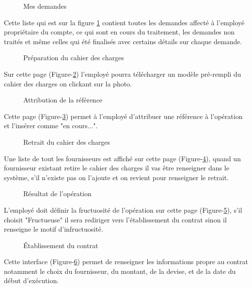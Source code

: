 \documentclass{report}
\begin{document}
\vspace{0.2cm}
\begin{figure}[h]
        \centering
        \caption{Mes demandes}
        \label{7}
\end{figure}
Cette liste qui est sur la figure \ref{7} contient toutes les demandes affecté à l'employé propriétaire du compte, ce qui sont en cours du traitement, les demandes non traités et même celles qui été finalisés avec certains détails sur chaque demande.

\newpage
\begin{figure}[h]
        \centering
        \caption{Préparation du cahier des charges}
        \label{8}
\end{figure}
Sur cette page (Figure-\ref{8}) l'employé pourra télécharger un modèle pré-rempli du cahier des charges on clickant sur la photo.

\vspace{0.4cm}
\begin{figure}[h]
        \centering
        \caption{Attribution de la référence}
        \label{9}
\end{figure}
Cette page (Figure-\ref{9}) permet à l'employé d'attribuer une référence à l’opération et l’insérer comme "en cours...".

\newpage
\begin{figure}[h]
        \centering
        \caption{Retrait du cahier des charges}
        \label{10}
\end{figure}
Une liste de tout les fournisseurs est affiché sur cette page (Figure-\ref{10}), quand un fournisseur existant retire le cahier des charges il vas être renseigner dans le système, s'il n'existe pas on l'ajoute et on revient pour renseigner le retrait.

\vspace{0.4cm}
\begin{figure}[h]
        \centering
        \caption{Résultat de l'opération}
        \label{11}
\end{figure}
L'employé doit définir la fructuosité de l’opération sur cette page (Figure-\ref{11}), s'il choisit "Fructueuse" il sera rediriger vers l’établissement du contrat sinon il renseigne le motif d'infructuosité.

\newpage
\begin{figure}[h]
        \centering
        \caption{Établissement du contrat}
        \label{12}
\end{figure}
\vspace{0.2cm}
Cette interface (Figure-\ref{12}) permet de renseigner les informations propre au contrat notamment le choix du fournisseur, du montant, de la devise, et de la date du début d’exécution.
\end{document}
